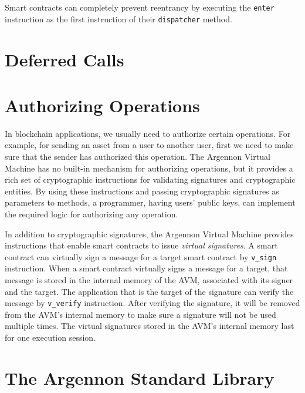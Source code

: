 Smart contracts can completely prevent reentrancy by executing the \texttt{enter} instruction as the first instruction
of their \texttt{dispatcher} method.


\section{Deferred Calls}\label{sec:deferred-calls}


\section{Authorizing Operations}\label{sec:authorizing-operations}

In blockchain applications, we usually need to authorize certain operations. For example, for sending an asset
from a user to another user, first we need to make sure that the sender has authorized this operation. The
Argennon Virtual Machine has no built-in mechanism for authorizing operations, but it provides a rich set of
cryptographic instructions for validating signatures and cryptographic entities. By using these instructions and
passing cryptographic signatures as parameters to methods, a programmer, having users' public keys, can implement
the required logic for authorizing any operation.


In addition to cryptographic signatures, the Argennon Virtual Machine provides instructions that enable
smart contracts to issue \emph{virtual signatures}. A smart contract can virtually sign a message for a target
smart contract by \texttt{v\_sign} instruction. When a smart contract
virtually signs a message for a target, that message is stored in the internal memory of the AVM, associated with
its signer and the target. The application that is the target of the signature can verify the message
by \texttt{v\_verify} instruction. After verifying the signature, it will be removed from the AVM's internal memory
to make sure a signature will not be used multiple times. The virtual signatures stored in the AVM's internal memory
last for one execution session.



\section{The Argennon Standard Library}\label{sec:asl}

